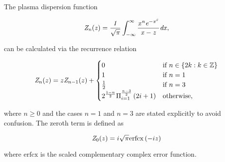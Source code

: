 \documentclass[12pt]{iopart}
\begin{document}
\appendix

\section{}

The plasma dispersion function\cite{Fried1961}

\begin{equation}
\it{Z}_n(z)=\frac{1}{\sqrt{\pi}}\int_{-\infty}^{\infty}\frac{x^n e^{-x^2}}{x-z}dx,
\end{equation}

\noindent can be calculated via the recurrence relation\cite{Sampoorna2007}

\begin{equation}
{\it Z}_n(z) = z {\it Z}_{n-1}(z) + \begin{cases}
0 & \text{if } n \in \{2k : k \in \mathbb{Z}\}
\\
1 & \text{if } n = 1
\\
\frac{1}{2} & \text{if } n = 3
\\
2^{\frac{1-n}{2}} \Pi_{i=1}^{\frac{n-3}{2}} \left( 2i + 1 \right) & \text{otherwise},
\end{cases}
\end{equation}

\noindent where $n \geq 0$ and the cases $n=1$ and $n=3$ are stated explicitly to avoid confusion. The zeroth term is defined as

\begin{equation}
 {\it Z}_0(z) = i \sqrt{\pi} \mathrm{erfcx} \left(-i z \right)
\end{equation}

\noindent where $\mathrm{erfcx}$ is the scaled complementary complex error function.

\newpage



\end{document}
